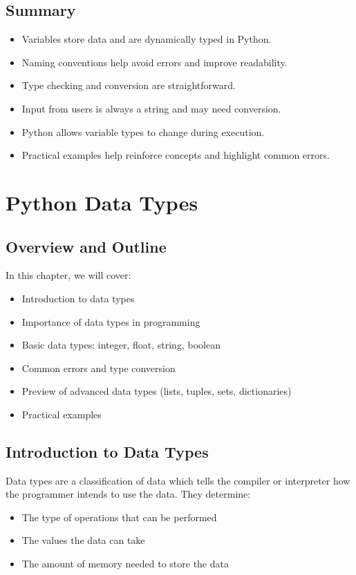 \section{Summary}

\begin{itemize}
    \item Variables store data and are dynamically typed in Python.
    \item Naming conventions help avoid errors and improve readability.
    \item Type checking and conversion are straightforward.
    \item Input from users is always a string and may need conversion.
    \item Python allows variable types to change during execution.
    \item Practical examples help reinforce concepts and highlight common errors.
\end{itemize}


\chapter{Python Data Types}

\section{Overview and Outline}

In this chapter, we will cover:
\begin{itemize}
    \item Introduction to data types
    \item Importance of data types in programming
    \item Basic data types: integer, float, string, boolean
    \item Common errors and type conversion
    \item Preview of advanced data types (lists, tuples, sets, dictionaries)
    \item Practical examples
\end{itemize}

\section{Introduction to Data Types}

Data types are a classification of data which tells the compiler or interpreter how the programmer intends to use the data.  
They determine:
\begin{itemize}
    \item The type of operations that can be performed
    \item The values the data can take
    \item The amount of memory needed to store the data
\end{itemize}

